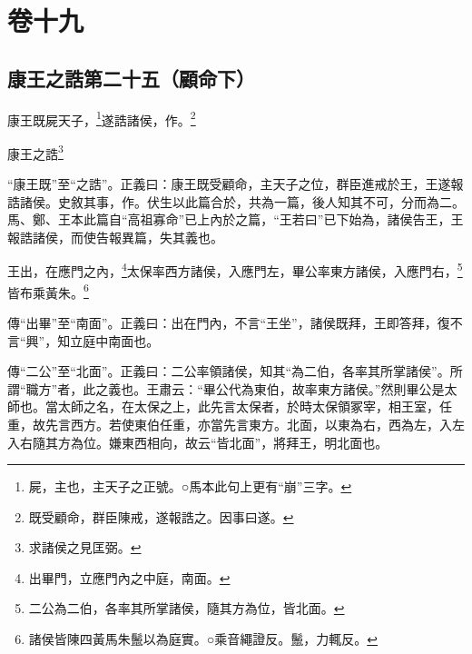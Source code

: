 

\chapter{卷十九}


\section{康王之誥第二十五（顧命下）}


康王既屍天子，\footnote{屍，主也，主天子之正號。○馬本此句上更有“崩”三字。}遂誥諸侯，作。\footnote{既受顧命，群臣陳戒，遂報誥之。因事曰遂。}

康王之誥\footnote{求諸侯之見匡弼。}

{\noindent\shu{}\fzkt “康王既”至“之誥”。正義曰：康王既受顧命，主天子之位，群臣進戒於王，王遂報誥諸侯。史敘其事，作。伏生以此篇合於，共為一篇，後人知其不可，分而為二。馬、鄭、王本此篇自“高祖寡命”已上內於之篇，“王若曰”已下始為，諸侯告王，王報誥諸侯，而使告報異篇，失其義也。 \par}

王出，在應門之內，\footnote{出畢門，立應門內之中庭，南面。}太保率西方諸侯，入應門左，畢公率東方諸侯，入應門右，\footnote{二公為二伯，各率其所掌諸侯，隨其方為位，皆北面。}皆布乘黃朱。\footnote{諸侯皆陳四黃馬朱鬛以為庭實。○乘音繩證反。鬛，力輒反。}


{\noindent\zhuan{}\fzbyks 傳“出畢”至“南面”。正義曰：出在門內，不言“王坐”，諸侯既拜，王即答拜，復不言“興”，知立庭中南面也。 \par}

{\noindent\zhuan{}\fzbyks 傳“二公”至“北面”。正義曰：二公率領諸侯，知其“為二伯，各率其所掌諸侯”。所謂“職方”者，此之義也。王肅云：“畢公代為東伯，故率東方諸侯。”然則畢公是太師也。當太師之名，在太保之上，此先言太保者，於時太保領冢宰，相王室，任重，故先言西方。若使東伯任重，亦當先言東方。北面，以東為右，西為左，入左入右隨其方為位。嫌東西相向，故云“皆北面”，將拜王，明北面也。 \par}

